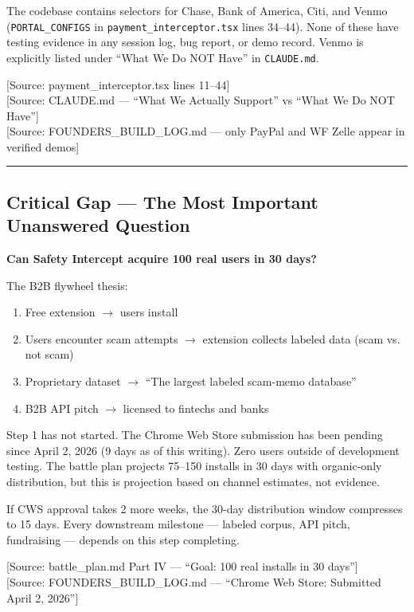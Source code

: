 \documentclass[11pt, letterpaper]{article}
\newcommand{\source}[1]{\textcolor{citation}{[Source: #1]}}
\begin{document}
  The codebase contains selectors for Chase, Bank of America, Citi, and Venmo (\texttt{PORTAL\_CONFIGS} in \texttt{payment\_interceptor.tsx} lines 34--44). None of these have testing evidence in any session log, bug report, or demo record. Venmo is explicitly listed under ``What We Do NOT Have'' in \texttt{CLAUDE.md}.

  \source{payment\_interceptor.tsx lines 11--44}\\
  \source{CLAUDE.md --- ``What We Actually Support'' vs ``What We Do NOT Have''}\\
  \source{FOUNDERS\_BUILD\_LOG.md --- only PayPal and WF Zelle appear in verified demos}

  \vspace{12pt}
  \hrule
  \vspace{12pt}

  \subsection{Critical Gap --- The Most Important Unanswered Question}

  \textbf{Can Safety Intercept acquire 100 real users in 30 days?}

  The B2B flywheel thesis:
  \begin{enumerate}[nosep]
    \item Free extension $\rightarrow$ users install
    \item Users encounter scam attempts $\rightarrow$ extension collects labeled data (scam vs. not scam)
    \item Proprietary dataset $\rightarrow$ ``The largest labeled scam-memo database''
    \item B2B API pitch $\rightarrow$ licensed to fintechs and banks
  \end{enumerate}

  Step 1 has not started. The Chrome Web Store submission has been pending since April 2, 2026 (9 days as of this writing). Zero users outside of development testing. The battle plan projects 75--150 installs in 30 days with organic-only distribution, but this is projection based on channel estimates, not evidence.

  If CWS approval takes 2 more weeks, the 30-day distribution window compresses to 15 days. Every downstream milestone --- labeled corpus, API pitch, fundraising --- depends on this step completing.

  \source{battle\_plan.md Part IV --- ``Goal: 100 real installs in 30 days''}\\
  \source{FOUNDERS\_BUILD\_LOG.md --- ``Chrome Web Store: Submitted April 2, 2026''}
\end{document}
